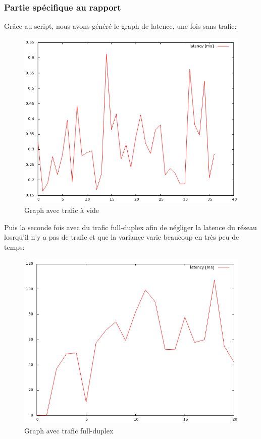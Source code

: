 \documentclass{article}
\begin{document}
\subsubsection{Partie spécifique au rapport}
Grâce au script, nous avons généré le graph de latence, une fois sans trafic:
\begin{figure}[h]
  \centering
  \includegraphics[width=\linewidth]{./captures/6-plot.png}
  \caption{Graph avec trafic à vide}
  \label{fig:token-bucket}
\end{figure}
\newpage

Puis la seconde fois avec du trafic full-duplex afin de négliger la latence du réseau losrqu'il n'y a pas de trafic et que la variance varie beaucoup en très peu de temps:
\begin{figure}[h]
  \centering
  \includegraphics[width=\linewidth]{./captures/6-plot-fullduplex.png}
  \caption{Graph avec trafic full-duplex}
  \label{fig:token-bucket}
\end{figure}
\newpage
\end{document}
